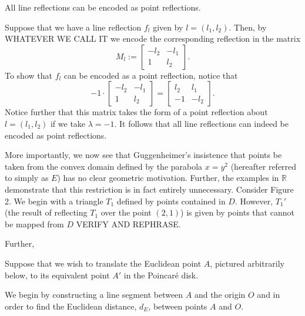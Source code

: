 \documentclass[12pt]{article}
\newcommand{\R}{\mathbb{R}}
\newcommand{\poincare}{Poincar\'{e} }
\newcommand{\lftmat}[4]{\begin{bmatrix} {#1} & {#2} \\ {#3} & {#4} \end{bmatrix}}
\newcommand{\linenoendmat}[2]{\begin{bmatrix} -{#2} & -{#1} \\ 1 & {#2} \end{bmatrix}}
\newcommand{\stanlinenoendmat}{\linenoendmat{l_1}{l_2}}
\theoremstyle{plain}
\theoremstyle{definition}
\begin{document}
 All line reflections can be encoded as point reflections. 

 Suppose that we have a line reflection $f_l$ given by $l = (l_1, l_2)$. Then, by WHATEVER WE CALL IT we encode the corresponding reflection in the matrix 
\[ M_l := \stanlinenoendmat. \]
To show that $f_l$ can be encoded as a point reflection, notice that 
\[ -1 \cdot \stanlinenoendmat = \lftmat{l_2}{l_1}{-1}{-l_2}.\]
Notice further that this matrix takes the form of a point reflection about $l = (l_1, l_2)$ if we take $\lambda = -1$. It follows that all line reflections can indeed be encoded as point reflections.
\wtfqed


More importantly, we now see that Guggenheimer's insistence that points be taken from the convex domain defined by the parabola $x = y^2$ (hereafter referred to simply as $E$) has no clear geometric motivation. Further, the examples in $\R$ demonstrate that this restriction is in fact entirely unnecessary. Consider Figure 2. We begin with a triangle $T_1$ defined by points contained in $D$. However, $T_1'$ (the result of reflecting $T_1$ over the point $(2, 1)$) is given by points that cannot be mapped from $D$ VERIFY AND REPHRASE. 

Further, 




\newpage
\wtftitle{Appendix A1: From $\R^2$ to the \poincare Disk}

Suppose that we wish to translate the Euclidean point $A$, pictured arbitrarily below, to its equivalent point $A'$ in the \poincare disk.

\begin{center}
\end{center}

We begin by constructing a line segment between $A$ and the origin $O$ and in order to find the Euclidean distance, $d_E$, between points $A$ and $O$.

\begin{center}
\end{center}
\end{document}
